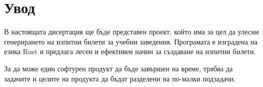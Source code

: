 \section{Увод}

В настоящата дисертация ще бъде представен проект, който има за цел да улесни
генерирането на изпитни билети за учебни заведения. Програмата е изградена на
езика Rust и предлага лесен и ефективен начин за създаване на изпитни билети.

За да може един софтурен продукт да бъде завършен на време, трябва да задачите
и целите на продукта да бъдат разделени на по-малки подзадачи.
%
% 
% 
% 
% 


%

